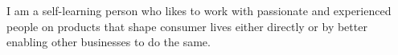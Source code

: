 
\begin{cvparagraph}

I am a self-learning person who likes to work with passionate and experienced
people on products that shape consumer lives either directly or by better
enabling other businesses to do the same.
\end{cvparagraph}
